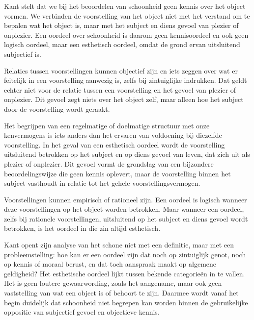 \begin{mdframed}[leftmargin=0pt,rightmargin=0pt,backgroundcolor=blue!6,linecolor=white,innertopmargin=6pt,innerbottommargin=6pt]

Kant stelt dat we bij het beoordelen van schoonheid geen kennis over het object vormen. We verbinden de voorstelling van het object niet met het verstand om te bepalen wat het object is, maar met het subject en diens gevoel van plezier of onplezier. Een oordeel over schoonheid is daarom geen kennisoordeel en ook geen logisch oordeel, maar een esthetisch oordeel, omdat de grond ervan uitsluitend subjectief is.

Relaties tussen voorstellingen kunnen objectief zijn en iets zeggen over wat er feitelijk in een voorstelling aanwezig is, zelfs bij zintuiglijke indrukken. Dat geldt echter niet voor de relatie tussen een voorstelling en het gevoel van plezier of onplezier. Dit gevoel zegt niets over het object zelf, maar alleen hoe het subject door de voorstelling wordt geraakt.

Het begrijpen van een regelmatige of doelmatige structuur met onze kenvermogens is iets anders dan het ervaren van voldoening bij diezelfde voorstelling. In het geval van een esthetisch oordeel wordt de voorstelling uitsluitend betrokken op het subject en op diens gevoel van leven, dat zich uit als plezier of onplezier. Dit gevoel vormt de grondslag van een bijzondere beoordelingswijze die geen kennis oplevert, maar de voorstelling binnen het subject vasthoudt in relatie tot het gehele voorstellingsvermogen.

Voorstellingen kunnen empirisch of rationeel zijn. Een oordeel is logisch wanneer deze voorstellingen op het object worden betrokken. Maar wanneer een oordeel, zelfs bij rationele voorstellingen, uitsluitend op het subject en diens gevoel wordt betrokken, is het oordeel in die zin altijd esthetisch.

\bigskip
Kant opent zijn analyse van het schone niet met een definitie, maar met een probleemstelling: hoe kan er een oordeel zijn dat noch op zintuiglijk genot, noch op kennis of moraal berust, en dat toch aanspraak maakt op algemene geldigheid? Het esthetische oordeel lijkt tussen bekende categorieën in te vallen. Het is geen loutere gewaarwording, zoals het aangename, maar ook geen vaststelling van wat een object is of behoort te zijn. Daarmee wordt vanaf het begin duidelijk dat schoonheid niet begrepen kan worden binnen de gebruikelijke oppositie van subjectief gevoel en objectieve kennis.


\end{mdframed}
